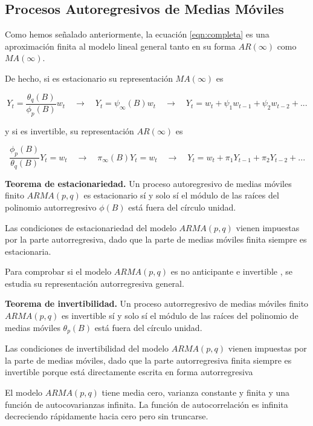 \documentclass[a4paper,10pt]{article}
\begin{document}
\subsection{Procesos Autoregresivos de Medias Móviles}

Como hemos señalado anteriormente, la ecuación \ref{eqn:completa} es una aproximación finita al modelo lineal general tanto en su forma $AR(\infty)$ como $MA(\infty)$.

De hecho, si es estacionario su representación $MA(\infty)$ es

\begin{equation}
Y_t = \frac{\theta_q(B)}{\phi_p(B)} w_t \quad \to \quad Y_t = \psi_\infty(B) w_t \quad \to \quad Y_t = w_t + \psi_1 w_{t-1} + \psi_2 w_{t-2} + ...
\end{equation}

y si es invertible, su representación $AR(\infty)$ es

\begin{equation}
\frac{\phi_p(B)}{\theta_q(B)} Y_t = w_t \quad \to \quad \pi_\infty(B) Y_t = w_t \quad \to \quad Y_t = w_t + \pi_1 Y_{t-1} + \pi_2 Y_{t-2} + ...
\end{equation}

\textbf{Teorema de estacionariedad.} Un proceso autoregresivo de medias móviles finito $ARMA(p,q)$ es estacionario sí y solo sí el módulo de las raíces del polinomio autorregresivo $\phi(B)$ está fuera del círculo unidad.

Las condiciones de estacionariedad del modelo $ARMA(p,q)$ vienen impuestas por la parte autorregresiva, dado que la parte de medias móviles finita siempre es estacionaria.

Para comprobar si el modelo $ARMA(p,q)$ es no anticipante e invertible , se estudia su representación autorregresiva general.

\textbf{Teorema de invertibilidad.} Un proceso autorregresivo de medias móviles finito $ARMA(p,q)$ es invertible sí y solo sí el módulo de las raíces del polinomio de medias móviles $\theta_p(B)$ está fuera del círculo unidad.

Las condiciones de invertibilidad del modelo $ARMA(p,q)$ vienen impuestas por la parte de medias móviles, dado que la parte autorregresiva finita siempre es invertible porque está directamente escrita en forma autorregresiva

El modelo $ARMA(p,q)$ tiene media cero, varianza constante y finita y una función de autocovarianzas infinita. La función de autocorrelación es infinita decreciendo rápidamente hacia cero pero sin truncarse.
\end{document}
